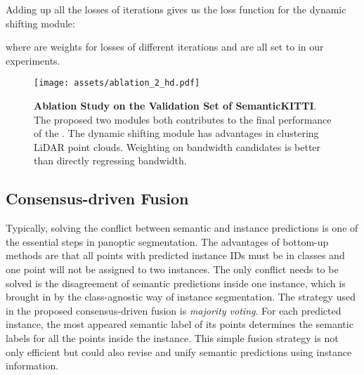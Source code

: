 \documentclass[final]{cvpr}
\begin{document}
Adding up all the losses of  iterations gives us the loss function  for the dynamic shifting module:

where  are weights for losses of different iterations and are all set to  in our experiments. 
\begin{figure*}[ht]
    \vspace{-0.6cm}
    \begin{center}
\texttt{[image: assets/ablation\_2\_hd.pdf]}
    \end{center}
    \vspace{-0.6cm}
    \caption{\textbf{Ablation Study on the Validation Set of SemanticKITTI}. The proposed two modules both contributes to the final performance of the \nickname{}. The dynamic shifting module has advantages in clustering LiDAR point clouds. Weighting on bandwidth candidates is better than directly regressing bandwidth.}
    \label{fig:04_02_ablation}
    \vspace{-0.5cm}
\end{figure*} 
\subsection{Consensus-driven Fusion} \label{3.3}
Typically, solving the conflict between semantic and instance predictions is one of the essential steps
in panoptic segmentation.
The advantages of bottom-up methods are that all points with predicted instance IDs must be in
\things{} classes and one point will not be assigned to two instances.
The only conflict needs to be solved is the disagreement of semantic predictions inside one instance,
which is brought in by the class-agnostic way of instance segmentation.
The strategy used in the proposed consensus-driven fusion is \textit{majority voting}.
For each predicted instance, the most appeared semantic label of its points determines
the semantic labels for all the points inside the instance.
This simple fusion strategy is not only efficient but could also revise and unify semantic predictions
using instance information.
 
\end{document}
